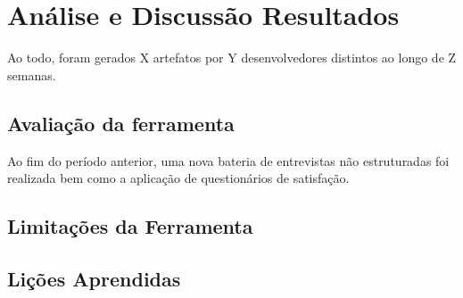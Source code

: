 \chapter{Análise e Discussão Resultados}

Ao todo, foram gerados X artefatos por Y desenvolvedores distintos ao longo de Z semanas.

\section{Avaliação da ferramenta}

Ao fim do período anterior, uma nova bateria de entrevistas não estruturadas foi realizada bem como a aplicação de questionários de satisfação.

\section{Limitações da Ferramenta}

\section{Lições Aprendidas}
